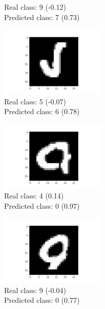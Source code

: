 \documentclass[a4paper]{article}    %
\begin{document}
\begin{figure}[H]
\begin{subfigure}{0.32\textwidth}
        \caption{
            Real class: 9 (-0.12)\\
            Predicted class: 7 (0.73)}
        \label{fig:example_4}
    \end{subfigure}
    \hfill
    \begin{subfigure}{0.32\textwidth}
        \centering
        \includegraphics[width=5.0cm]{12}
        \caption{
            Real class: 5 (-0.07)\\
            Predicted class: 6 (0.78)}
        \label{fig:example_5}
    \end{subfigure}
    \hfill
    \begin{subfigure}{0.32\textwidth}
        \centering
        \includegraphics[width=5.0cm]{14}
        \caption{
            Real class: 4 (0.14)\\
            Predicted class: 0 (0.97)}
        \label{fig:example_6}
    \end{subfigure}
    \hfill
    \begin{subfigure}{0.32\textwidth}
        \centering
        \includegraphics[width=5.0cm]{17}
        \caption{
            Real class: 9 (-0.04)\\
            Predicted class: 0 (0.77)}
        \label{fig:example_7}
    \end{subfigure}
    \hfill
    \begin{subfigure}{0.32\textwidth}
        \centering

\end{subfigure}
\end{figure}
\end{document}
